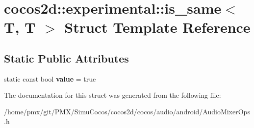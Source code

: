 \hypertarget{structcocos2d_1_1experimental_1_1is__same_3_01T_00_01T_01_4}{}\section{cocos2d\+:\+:experimental\+:\+:is\+\_\+same$<$ T, T $>$ Struct Template Reference}
\label{structcocos2d_1_1experimental_1_1is__same_3_01T_00_01T_01_4}
\subsection*{Static Public Attributes}
\begin{DoxyCompactItemize}
\item 
\mbox{\label{structcocos2d_1_1experimental_1_1is__same_3_01T_00_01T_01_4_a9036a2f78f692f42bfb7583792a8c958}} 
static const bool {\bfseries value} = true
\end{DoxyCompactItemize}


The documentation for this struct was generated from the following file\+:\begin{DoxyCompactItemize}
\item 
/home/pmx/git/\+P\+M\+X/\+Simu\+Cocos/cocos2d/cocos/audio/android/Audio\+Mixer\+Ops.\+h\end{DoxyCompactItemize}

